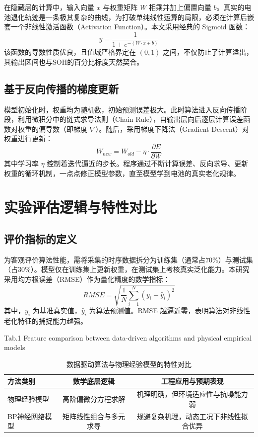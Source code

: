 \documentclass[a4paper,10.5pt]{article}
\begin{document}
在隐藏层的计算中，输入向量 $x$ 与权重矩阵 $W$ 相乘并加上偏置向量 $b$。真实的电池退化轨迹是一条极其复杂的曲线，为打破单纯线性运算的局限，必须在计算后嵌套一个非线性激活函数（Activation Function）。本文采用经典的 Sigmoid 函数：
\begin{equation}
    y=\frac{1}{1+e^{-(W \cdot x+b)}}
\end{equation}
该函数的导数性质优良，且值域严格界定在 $(0,1)$ 之间，不仅防止了计算溢出，其输出区间也与SOH的百分比标度天然契合。

\subsection{基于反向传播的梯度更新}
模型初始化时，权重均为随机数，初始预测误差极大。此时算法进入反向传播阶段，利用微积分中的链式求导法则（Chain Rule），自输出层向后逐层计算误差函数对权重的偏导数（即梯度 $\nabla$）。随后，采用梯度下降法（Gradient Descent）对权重进行更新：
\begin{equation}
    W_{new} = W_{old} - \eta \cdot \frac{\partial E}{\partial W}
\end{equation}
其中学习率 $\eta$ 控制着迭代逼近的步长。程序通过不断计算误差、反向求导、更新权重的循环机制，一点点修正模型参数，直至模型学到电池的真实老化规律。

\section{实验评估逻辑与特性对比}

\subsection{评价指标的定义}
为客观评价算法性能，需将采集的时序数据拆分为训练集（通常占70\%）与测试集（占30\%）。模型仅在训练集上更新权重，在测试集上考核真实泛化能力。本研究采用均方根误差（RMSE）作为量化精度的数学指标：
\begin{equation}
    RMSE=\sqrt{\frac{1}{N}\sum_{i=1}^{N}(y_{i}-\hat{y}_{i})^{2}}
\end{equation}
其中，$y_{i}$ 为基准真实值，$\hat{y}_{i}$ 为算法预测值。RMSE 越逼近零，表明算法对非线性老化特征的捕捉能力越强。

\begin{table}[htbp]
    \centering
    \caption{数据驱动算法与物理经验模型的特性对比}
    \centerline{ Tab.1 Feature comparison between data-driven algorithms and physical empirical models}
    \vspace{0.5em}
    \begin{tabular}{lcc}
        \toprule
        方法类别 & 数学底层逻辑 & 工程应用与预期表现 \\
        \midrule
        物理经验模型 & 高阶偏微分方程求解 & 机理明确，但环境适应性与抗噪能力弱 \\
        BP神经网络模型 & 矩阵线性组合与多元求导 & 规避复杂机理，动态工况下非线性拟合优异 \\
        \bottomrule
    \end{tabular}
\end{table}
\end{document}
